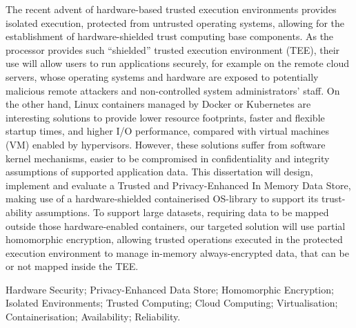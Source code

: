 The recent advent of hardware-based trusted execution environments provides isolated execution, protected from untrusted operating systems, allowing for the establishment of hardware-shielded trust computing base components. As the processor provides such “shielded” trusted execution environment (TEE), their use will allow users to run applications securely, for example on the remote cloud servers, whose operating systems and hardware are exposed to potentially malicious remote attackers and non-controlled system administrators’ staff. On the other hand, Linux containers managed by Docker or Kubernetes are interesting solutions to provide lower resource footprints, faster and flexible startup times, and higher I/O performance, compared with virtual machines (VM) enabled by hypervisors. However, these solutions suffer from software kernel mechanisms, easier to be compromised in confidentiality and integrity assumptions of supported application data.
This dissertation will design, implement and evaluate a Trusted and Privacy-Enhanced In Memory Data Store, making use of a hardware-shielded containerised OS-library to support its trust-ability assumptions. To support large datasets, requiring data to be mapped outside those hardware-enabled containers, our targeted solution will use partial homomorphic encryption, allowing trusted operations executed in the protected execution environment to manage in-memory always-encrypted data, that can be or not mapped inside the TEE.

\begin{keywords}
Hardware Security; Privacy-Enhanced Data Store; Homomorphic Encryption; Isolated Environments; Trusted Computing; Cloud Computing; Virtualisation; Containerisation; Availability; Reliability.
\end{keywords} 
